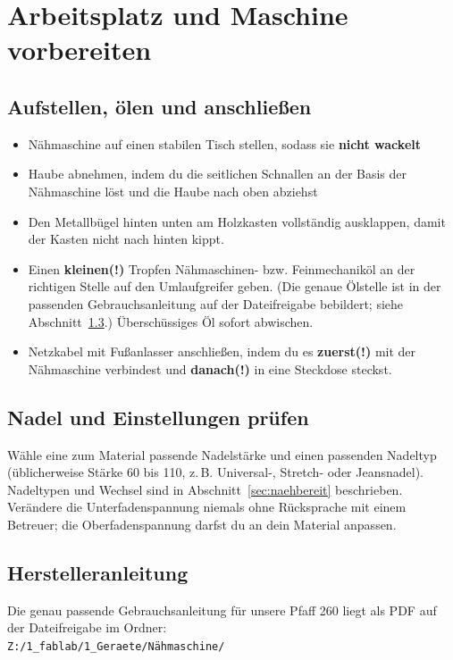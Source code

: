 \documentclass{\basedir/fablab-document}
\begin{document}
\section{Arbeitsplatz und Maschine vorbereiten}
\subsection{Aufstellen, ölen und anschließen}
\begin{itemize}
	\item Nähmaschine auf einen stabilen Tisch stellen, sodass sie \textbf{nicht wackelt}
	\item Haube abnehmen, indem du die seitlichen Schnallen an der Basis der Nähmaschine löst und die Haube nach oben abziehst
	\item Den Metallbügel hinten unten am Holzkasten vollständig ausklappen, damit der Kasten nicht nach hinten kippt.
	\item Einen \textbf{kleinen(!)} Tropfen Nähmaschinen- bzw. Feinmechaniköl an der richtigen Stelle auf den Umlaufgreifer geben. (Die genaue Ölstelle ist in der passenden Gebrauchsanleitung auf der Dateifreigabe bebildert; siehe Abschnitt~\ref{sec:handbuch}.) Überschüssiges Öl sofort abwischen.
	\item Netzkabel mit Fußanlasser anschließen, indem du es \textbf{zuerst(!)} mit der Nähmaschine verbindest und \textbf{danach(!)} in eine Steckdose steckst.
\end{itemize}


\subsection{Nadel und Einstellungen prüfen}
Wähle eine zum Material passende Nadelstärke und einen passenden Nadeltyp
(üblicherweise Stärke 60 bis 110, z.\,B. Universal-, Stretch- oder Jeansnadel).
Nadeltypen und Wechsel sind in Abschnitt~\ref{sec:naehbereit} beschrieben.
Verändere die Unterfadenspannung niemals ohne Rücksprache mit einem Betreuer;
die Oberfadenspannung darfst du an dein Material anpassen.

\subsection{Herstelleranleitung}\label{sec:handbuch}
Die genau passende Gebrauchsanleitung für unsere Pfaff 260 liegt als PDF
auf der Dateifreigabe im Ordner:\\[1mm]
\texttt{Z:/1\_fablab/1\_Geraete/}\allowbreak\texttt{Nähmaschine/}
\end{document}
